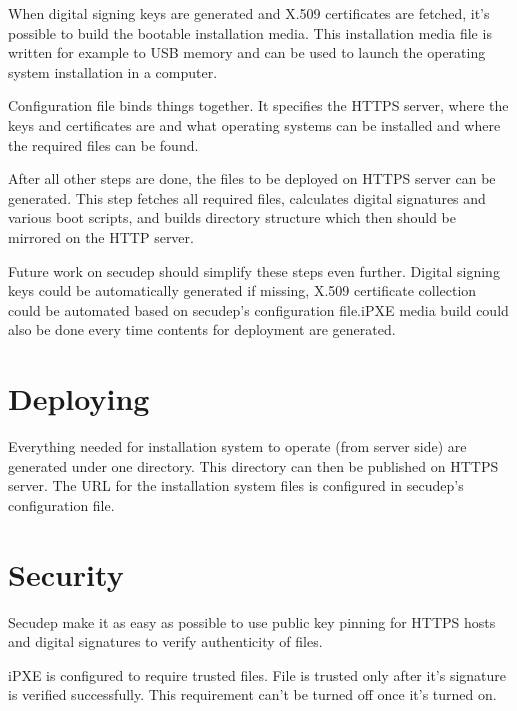 When digital signing keys are generated and X.509 certificates are
fetched, it's possible to build the bootable installation media. This
installation media file is written for example to USB memory and can
be used to launch the operating system installation in a computer.

Configuration file binds things together. It specifies the HTTPS
server, where the keys and certificates are and what operating systems
can be installed and where the required files can be found.

After all other steps are done, the files to be deployed on HTTPS
server can be generated. This step fetches all required files,
calculates digital signatures and various boot scripts, and builds
directory structure which then should be mirrored on the HTTP server.

Future work on secudep should simplify these steps even further.
Digital signing keys could be automatically generated if missing,
X.509 certificate collection could be automated based on secudep's
configuration file.\@ iPXE media build could also be done every time
contents for deployment are generated.

\section{Deploying}


Everything needed for installation system to operate (from server
side) are generated under one directory. This directory can then be
published on HTTPS server. The URL for the installation system files
is configured in secudep's configuration file.

\section{Security}

Secudep make it as easy as possible to use public key pinning for
HTTPS hosts and digital signatures to verify authenticity of files.

iPXE is configured to require trusted files. File is trusted only
after it's signature is verified successfully. This requirement can't
be turned off once it's turned on.

